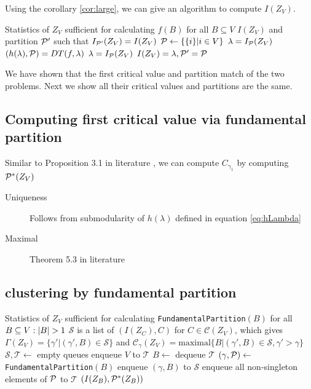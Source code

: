 \documentclass{article}
\begin{document}
Using the corollary \ref{cor:large}, we can give an algorithm to compute $I(Z_V)$.
\begin{algorithm}
	\begin{algorithmic}[1]
		\REQUIRE Statistics of $Z_V$ sufficient for calculating $f(B)$ for all $B \subseteq V$
		\ENSURE $I(Z_V)$ and partition $\P'$ such that $I_{\P'}(Z_V) = I(Z_V)$
		\STATE $\P \leftarrow \{ \{i \} | i \in V\}$
		\STATE $\lambda = I_{\P}(Z_V)$
		\STATE $(h(\lambda), \P)=DT(f,\lambda)$
		\STATE $\lambda = I_{\P}(Z_V)$
		\ENDWHILE
		\STATE $I(Z_V) = \lambda, \P' = \P$
	\end{algorithmic}
\end{algorithm}

We have shown that the first critical value and partition match of the two problems. Next we show all their critical values and partitions are the same.
\begin{theorem}
	\end{theorem}
\subsection{Computing first critical value via fundamental partition}
Similar to Proposition 3.1 in literature \cite{ic}, we can compute $C_{\gamma_1}$ by computing $\P^*(Z_V)$
\begin{description}
\item[Uniqueness] Follows from submodularity of  $h(\lambda)$ defined in equation \eqref{eq:hLambda}
\item[Maximal] Theorem 5.3 in literature \cite{ska}
\end{description}

\subsection{clustering by fundamental partition}
\begin{algorithm}
\begin{algorithmic}[1]
\REQUIRE Statistics of $Z_V$ sufficient for calculating \texttt{FundamentalPartition}$(B)$ for all $B \subseteq V:\abs{B}>1$
\ENSURE $\mathcal{S}$ is a list of $(I(Z_C),C)$ for $ C \in \mathcal{C}(Z_V)$, which gives
$\Gamma(Z_V) = \{ \gamma' | (\gamma', B) \in \mathcal{S}\} $ and $ \mathcal{C}_{\gamma}(Z_V)
= \mathrm{maximal}\{B | (\gamma', B) \in \mathcal{S}, \gamma' > \gamma \}$
\STATE $\mathcal{S},\mathcal{T} \leftarrow$ empty queues
\STATE enqueue $V$ to $\mathcal{T}$
\STATE $B \leftarrow $ dequeue $\mathcal{T}$
\STATE $(\gamma, \P) \leftarrow$\texttt{FundamentalPartition}$(B)$
\STATE enqueue $(\gamma, B)$ to $\mathcal{S}$
\STATE enqueue all non-singleton elements of $\P$ to $\mathcal{T}$
\ENDWHILE
{}
  \RETURN $(I(Z_B), \P^*(Z_B))$
\ENDFUNCTION
\end{algorithmic}
\end{algorithm}
\end{document}

